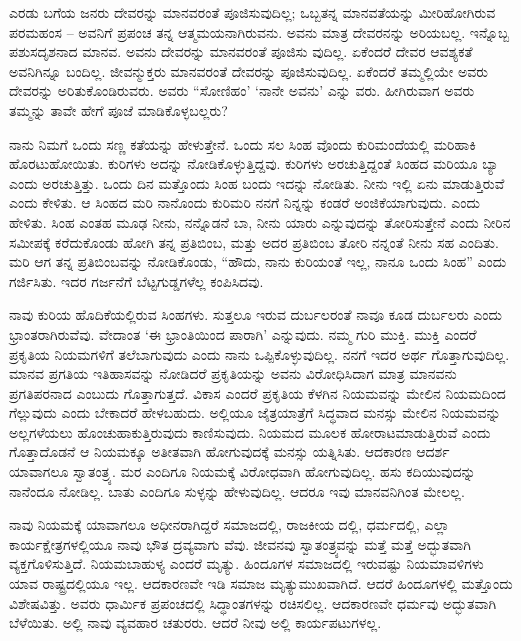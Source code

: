 ಎರಡು ಬಗೆಯ ಜನರು ದೇವರನ್ನು ಮಾನವರಂತೆ ಪೂಜಿಸುವುದಿಲ್ಲ; ಒಬ್ಬತನ್ನ ಮಾನವತೆಯನ್ನು ಮೀರಿಹೋಗಿರುವ ಪರಮಹಂಸ – ಅವನಿಗೆ ಪ್ರಪಂಚ ತನ್ನ ಆತ್ಮಮಯನಾಗಿರುವನು. ಅವನು ಮಾತ್ರ ದೇವರನನ್ನು ಅರಿಯಬಲ್ಲ. ಇನ್ನೊಬ್ಬ ಪಶುಸದೃಶನಾದ ಮಾನವ. ಅವನು ದೇವರನ್ನು ಮಾನವರಂತೆ ಪೂಜಿಸು ವುದಿಲ್ಲ. ಏಕೆಂದರೆ ದೇವರ ಆವಶ್ಯಕತೆ ಅವನಿಗಿನ್ನೂ ಬಂದಿಲ್ಲ. ಜೀವನ್ಮುಕ್ತರು ಮಾನವರಂತೆ ದೇವರನ್ನು ಪೂಜಿಸುವುದಿಲ್ಲ. ಏಕೆಂದರೆ ತಮ್ಮಲ್ಲಿಯೇ ಅವರು ದೇವರನ್ನು ಅರಿತುಕೊಂಡಿರುವರು. ಅವರು “ಸೋಣಿಹಂ’ ‘ನಾನೇ ಅವನು’ ಎನ್ನು ವರು. ಹೀಗಿರುವಾಗ ಅವರು ತಮ್ಮನ್ನು ತಾವೇ ಹೇಗೆ ಪೂಜೆ ಮಾಡಿಕೊಳ್ಳಬಲ್ಲರು?

ನಾನು ನಿಮಗೆ ಒಂದು ಸಣ್ಣ ಕತೆಯನ್ನು ಹೇಳುತ್ತೇನೆ. ಒಂದು ಸಲ ಸಿಂಹ ವೊಂದು ಕುರಿಮಂದೆಯಲ್ಲಿ ಮರಿಹಾಕಿ ಹೊರಟುಹೋಯಿತು. ಕುರಿಗಳು ಅದನ್ನು ನೋಡಿಕೊಳ್ಳುತ್ತಿದ್ದವು. ಕುರಿಗಳು ಅರಚುತ್ತಿದ್ದಂತೆ ಸಿಂಹದ ಮರಿಯೂ ಬ್ಯಾ ಎಂದು ಅರಚುತ್ತಿತ್ತು. ಒಂದು ದಿನ ಮತ್ತೊಂದು ಸಿಂಹ ಬಂದು ಇದನ್ನು ನೋಡಿತು. ನೀನು ಇಲ್ಲಿ ಏನು ಮಾಡುತ್ತಿರುವೆ ಎಂದು ಕೇಳಿತು. ಆ ಸಿಂಹದ ಮರಿ ನಾನೊಂದು ಕುರಿಮರಿ ನನಗೆ ನಿನ್ನನ್ನು ಕಂಡರೆ ಅಂಜಿಕೆಯಾಗುವುದು. ಎಂದು ಹೇಳಿತು. ಸಿಂಹ ಎಂತಹ ಮೂಢ ನೀನು, ನನ್ನೊಡನೆ ಬಾ, ನೀನು ಯಾರು ಎನ್ನುವುದನ್ನು ತೋರಿಸುತ್ತೇನೆ ಎಂದು ನೀರಿನ ಸಮೀಪಕ್ಕೆ ಕರೆದುಕೊಂಡು ಹೋಗಿ ತನ್ನ ಪ್ರತಿಬಿಂಬ, ಮತ್ತು ಅದರ ಪ್ರತಿಬಿಂಬ ತೋರಿ ನನ್ನಂತೆ ನೀನು ಸಹ ಎಂದಿತು. ಮರಿ ಆಗ ತನ್ನ ಪ್ರತಿಬಿಂಬವನ್ನು ನೋಡಿಕೊಂಡು, “ಹೌದು, ನಾನು ಕುರಿಯಂತೆ ಇಲ್ಲ, ನಾನೂ ಒಂದು ಸಿಂಹ” ಎಂದು ಗರ್ಜಿಸಿತು. ಇದರ ಗರ್ಜನೆಗೆ ಬೆಟ್ಟಗುಡ್ಡಗಳೆಲ್ಲ ಕಂಪಿಸಿದವು.

ನಾವು ಕುರಿಯ ಹೊದಿಕೆಯಲ್ಲಿರುವ ಸಿಂಹಗಳು. ಸುತ್ತಲೂ ಇರುವ ದುರ್ಬಲರಂತೆ ನಾವೂ ಕೂಡ ದುರ್ಬಲರು ಎಂದು ಭ್ರಾಂತರಾಗಿರುವೆವು. ವೇದಾಂತ ‘ಈ ಭ್ರಾಂತಿಯಿಂದ ಪಾರಾಗಿ’ ಎನ್ನುವುದು. ನಮ್ಮ ಗುರಿ ಮುಕ್ತಿ. ಮುಕ್ತಿ ಎಂದರೆ ಪ್ರಕೃತಿಯ ನಿಯಮಗಳಿಗೆ ತಲೆಬಾಗುವುದು ಎಂದು ನಾನು ಒಪ್ಪಿಕೊಳ್ಳುವುದಿಲ್ಲ. ನನಗೆ ಇದರ ಅರ್ಥ ಗೊತ್ತಾಗುವುದಿಲ್ಲ. ಮಾನವ ಪ್ರಗತಿಯ ಇತಿಹಾಸವನ್ನು ನೋಡಿದರೆ ಪ್ರಕೃತಿಯನ್ನು ಅವನು ವಿರೋಧಿಸಿದಾಗ ಮಾತ್ರ ಮಾನವನು ಪ್ರಗತಿಪರನಾದ ಎಂಬುದು ಗೊತ್ತಾಗುತ್ತದೆ. ವಿಕಾಸ ಎಂದರೆ ಪ್ರಕೃತಿಯ ಕೆಳಗಿನ ನಿಯಮವನ್ನು ಮೇಲಿನ ನಿಯಮದಿಂದ ಗೆಲ್ಲುವುದು ಎಂದು ಬೇಕಾದರೆ ಹೇಳಬಹುದು. ಅಲ್ಲಿಯೂ ಜೈತ್ರಯಾತ್ರೆಗೆ ಸಿದ್ಧವಾದ ಮನಸ್ಸು ಮೇಲಿನ ನಿಯಮವನ್ನು ಅಲ್ಲಗಳೆಯಲು ಹೊಂಚುಹಾಕುತ್ತಿರುವುದು ಕಾಣಿಸುವುದು. ನಿಯಮದ ಮೂಲಕ ಹೋರಾಟಮಾಡುತ್ತಿರುವೆ ಎಂದು ಗೊತ್ತಾದೊಡನೆ ಆ ನಿಯಮಕ್ಕೂ ಅತೀತವಾಗಿ ಹೋಗುವುದಕ್ಕೆ ಮನಸ್ಸು ಯತ್ನಿಸಿತು. ಆದಕಾರಣ ಆದರ್ಶ ಯಾವಾಗಲೂ ಸ್ವಾತಂತ್ರ್ಯ. ಮರ ಎಂದಿಗೂ ನಿಯಮಕ್ಕೆ ವಿರೋಧವಾಗಿ ಹೋಗುವುದಿಲ್ಲ. ಹಸು ಕದಿಯುವುದನ್ನು ನಾನೆಂದೂ ನೋಡಿಲ್ಲ. ಬಾತು ಎಂದಿಗೂ ಸುಳ್ಳನ್ನು ಹೇಳುವುದಿಲ್ಲ. ಆದರೂ ಇವು ಮಾನವನಿಗಿಂತ ಮೇಲಲ್ಲ.

ನಾವು ನಿಯಮಕ್ಕೆ ಯಾವಾಗಲೂ ಅಧೀನರಾಗಿದ್ದರೆ ಸಮಾಜದಲ್ಲಿ, ರಾಜಕೀಯ ದಲ್ಲಿ, ಧರ್ಮದಲ್ಲಿ, ಎಲ್ಲಾ ಕಾರ್ಯಕ್ಷೇತ್ರಗಳಲ್ಲಿಯೂ ನಾವು ಭೌತ ದ್ರವ್ಯವಾಗು ವೆವು. ಜೀವನವು ಸ್ವಾತಂತ್ರ್ಯವನ್ನು ಮತ್ತೆ ಮತ್ತೆ ಅದ್ಭುತವಾಗಿ ವ್ಯಕ್ತಗೊಳಿಸುತ್ತಿದೆ. ನಿಯಮಬಾಹುಳ್ಯ ಎಂದರೆ ಮೃತ್ಯು. ಹಿಂದೂಗಳ ಸಮಾಜದಲ್ಲಿ ಇರುವಷ್ಟು ನಿಯಮಾವಳಿಗಳು ಯಾವ ರಾಷ್ಟ್ರದಲ್ಲಿಯೂ ಇಲ್ಲ. ಆದಕಾರಣವೇ ಇಡಿ ಸಮಾಜ ಮೃತ್ಯುಮುಖವಾಗಿದೆ. ಆದರೆ ಹಿಂದೂಗಳಲ್ಲಿ ಮತ್ತೊಂದು ವಿಶೇಷವಿತ್ತು. ಅವರು ಧಾರ್ಮಿಕ ಪ್ರಪಂಚದಲ್ಲಿ ಸಿದ್ಧಾಂತಗಳನ್ನು ರಚಿಸಲಿಲ್ಲ. ಆದಕಾರಣವೇ ಧರ್ಮವು ಅದ್ಭುತವಾಗಿ ಬೆಳೆಯಿತು. ಅಲ್ಲಿ ನಾವು ವ್ಯವಹಾರ ಚತುರರು. ಆದರೆ ನೀವು ಅಲ್ಲಿ ಕಾರ್ಯಪಟುಗಳಲ್ಲ.

